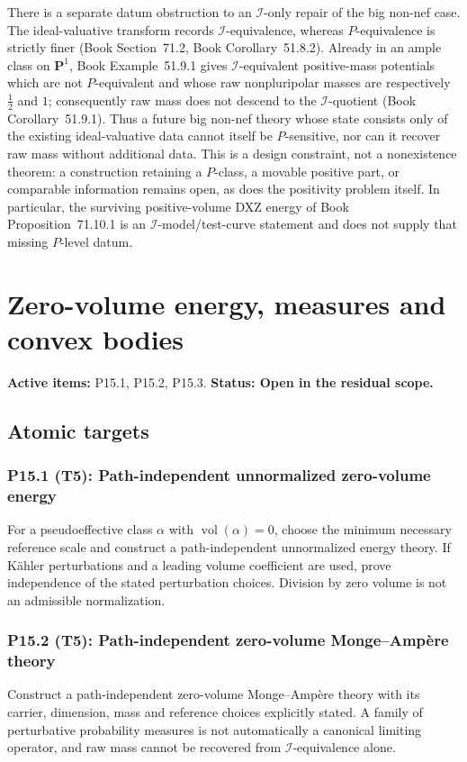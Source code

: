 \documentclass[11pt,a4paper]{article}
\theoremstyle{definition}
\theoremstyle{remark}
\begin{document}
There is a separate datum obstruction to an \(\mathcal I\)-only repair of
the big non-nef case.  The ideal-valuative transform records
\(\mathcal I\)-equivalence, whereas \(P\)-equivalence is strictly finer
(Book Section~71.2, Book Corollary~51.8.2).  Already
in an ample class on \(\mathbf P^1\), Book Example~51.9.1 gives
\(\mathcal I\)-equivalent positive-mass potentials which are not
\(P\)-equivalent and whose raw nonpluripolar masses are respectively
\(\tfrac12\) and \(1\); consequently raw mass does not descend to the
\(\mathcal I\)-quotient (Book Corollary~51.9.1).  Thus a
future big non-nef theory whose state consists only of the existing
ideal-valuative data cannot itself be \(P\)-sensitive, nor can it recover
raw mass without additional data.  This is a design constraint, not a
nonexistence theorem: a construction retaining a \(P\)-class, a movable
positive part, or comparable information remains open, as does the
positivity problem itself.  In particular, the surviving positive-volume
DXZ energy of Book Proposition~71.10.1 is an
\(\mathcal I\)-model/test-curve statement and does not supply that missing
\(P\)-level datum.

\clearpage\section{Zero-volume energy, measures and convex bodies}
\label{family:9}
\noindent\textbf{Active items:} P15.1, P15.2, P15.3. \textbf{Status: Open in the residual scope.}

\subsection{Atomic targets}
\subsubsection*{P15.1 (T5): Path-independent unnormalized zero-volume energy}
\label{atom:P15.1}
For a pseudoeffective class \(\alpha\) with \(\operatorname{vol}(\alpha)=0\), choose the minimum necessary reference scale and construct a path-independent unnormalized energy theory. If K\"ahler perturbations and a leading volume coefficient are used, prove independence of the stated perturbation choices. Division by zero volume is not an admissible normalization.

\subsubsection*{P15.2 (T5): Path-independent zero-volume Monge--Ampère theory}
\label{atom:P15.2}
Construct a path-independent zero-volume Monge--Ampère theory with its carrier, dimension, mass and reference choices explicitly stated. A family of perturbative probability measures is not automatically a canonical limiting operator, and raw mass cannot be recovered from \(\mathcal I\)-equivalence alone.
\end{document}
